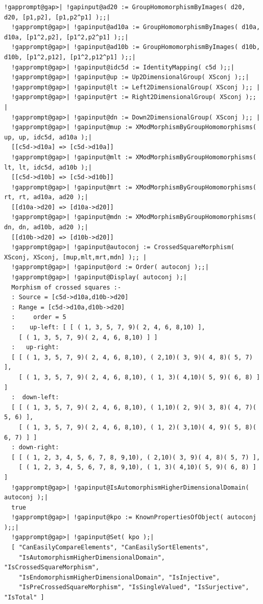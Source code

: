 \documentclass[a4paper,11pt]{report}
\begin{document}
{{\begin{Verbatim}[commandchars=!@|,fontsize=\small,frame=single,label=Example]
  !gapprompt@gap>| !gapinput@ad20 := GroupHomomorphismByImages( d20, d20, [p1,p2], [p1,p2^p1] );;|
  !gapprompt@gap>| !gapinput@ad10a := GroupHomomorphismByImages( d10a, d10a, [p1^2,p2], [p1^2,p2^p1] );;|
  !gapprompt@gap>| !gapinput@ad10b := GroupHomomorphismByImages( d10b, d10b, [p1^2,p12], [p1^2,p12^p1] );;|
  !gapprompt@gap>| !gapinput@idc5d := IdentityMapping( c5d );;|
  !gapprompt@gap>| !gapinput@up := Up2DimensionalGroup( XSconj );;|
  !gapprompt@gap>| !gapinput@lt := Left2DimensionalGroup( XSconj );; |
  !gapprompt@gap>| !gapinput@rt := Right2DimensionalGroup( XSconj );; |
  !gapprompt@gap>| !gapinput@dn := Down2DimensionalGroup( XSconj );; |
  !gapprompt@gap>| !gapinput@mup := XModMorphismByGroupHomomorphisms( up, up, idc5d, ad10a );|
  [[c5d->d10a] => [c5d->d10a]]
  !gapprompt@gap>| !gapinput@mlt := XModMorphismByGroupHomomorphisms( lt, lt, idc5d, ad10b );|
  [[c5d->d10b] => [c5d->d10b]]
  !gapprompt@gap>| !gapinput@mrt := XModMorphismByGroupHomomorphisms( rt, rt, ad10a, ad20 );|
  [[d10a->d20] => [d10a->d20]]
  !gapprompt@gap>| !gapinput@mdn := XModMorphismByGroupHomomorphisms( dn, dn, ad10b, ad20 );|
  [[d10b->d20] => [d10b->d20]]
  !gapprompt@gap>| !gapinput@autoconj := CrossedSquareMorphism( XSconj, XSconj, [mup,mlt,mrt,mdn] );; |
  !gapprompt@gap>| !gapinput@ord := Order( autoconj );;|
  !gapprompt@gap>| !gapinput@Display( autoconj );|
  Morphism of crossed squares :- 
  : Source = [c5d->d10a,d10b->d20]
  : Range = [c5d->d10a,d10b->d20]
  :     order = 5
  :    up-left: [ [ ( 1, 3, 5, 7, 9)( 2, 4, 6, 8,10) ], 
    [ ( 1, 3, 5, 7, 9)( 2, 4, 6, 8,10) ] ]
  :   up-right: 
  [ [ ( 1, 3, 5, 7, 9)( 2, 4, 6, 8,10), ( 2,10)( 3, 9)( 4, 8)( 5, 7) ], 
    [ ( 1, 3, 5, 7, 9)( 2, 4, 6, 8,10), ( 1, 3)( 4,10)( 5, 9)( 6, 8) ] ]
  :  down-left: 
  [ [ ( 1, 3, 5, 7, 9)( 2, 4, 6, 8,10), ( 1,10)( 2, 9)( 3, 8)( 4, 7)( 5, 6) ], 
    [ ( 1, 3, 5, 7, 9)( 2, 4, 6, 8,10), ( 1, 2)( 3,10)( 4, 9)( 5, 8)( 6, 7) ] ]
  : down-right: 
  [ [ ( 1, 2, 3, 4, 5, 6, 7, 8, 9,10), ( 2,10)( 3, 9)( 4, 8)( 5, 7) ], 
    [ ( 1, 2, 3, 4, 5, 6, 7, 8, 9,10), ( 1, 3)( 4,10)( 5, 9)( 6, 8) ] ]
  !gapprompt@gap>| !gapinput@IsAutomorphismHigherDimensionalDomain( autoconj );|
  true
  !gapprompt@gap>| !gapinput@kpo := KnownPropertiesOfObject( autoconj );;|
  !gapprompt@gap>| !gapinput@Set( kpo );|
  [ "CanEasilyCompareElements", "CanEasilySortElements", 
    "IsAutomorphismHigherDimensionalDomain", "IsCrossedSquareMorphism", 
    "IsEndomorphismHigherDimensionalDomain", "IsInjective", 
    "IsPreCrossedSquareMorphism", "IsSingleValued", "IsSurjective", "IsTotal" ]
  

\end{Verbatim}}}
\end{document}

